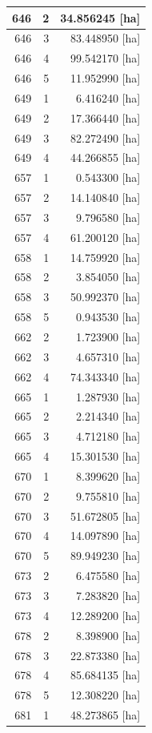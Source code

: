 \documentclass[11pt,]{book}
\begin{document}
\begin{table}
\begin{tabular}[t]{r|r|r}
\hline
646 & 2 & 34.856245 [ha]\\
\hline
646 & 3 & 83.448950 [ha]\\
\hline
646 & 4 & 99.542170 [ha]\\
\hline
646 & 5 & 11.952990 [ha]\\
\hline
649 & 1 & 6.416240 [ha]\\
\hline
649 & 2 & 17.366440 [ha]\\
\hline
649 & 3 & 82.272490 [ha]\\
\hline
649 & 4 & 44.266855 [ha]\\
\hline
657 & 1 & 0.543300 [ha]\\
\hline
657 & 2 & 14.140840 [ha]\\
\hline
657 & 3 & 9.796580 [ha]\\
\hline
657 & 4 & 61.200120 [ha]\\
\hline
658 & 1 & 14.759920 [ha]\\
\hline
658 & 2 & 3.854050 [ha]\\
\hline
658 & 3 & 50.992370 [ha]\\
\hline
658 & 5 & 0.943530 [ha]\\
\hline
662 & 2 & 1.723900 [ha]\\
\hline
662 & 3 & 4.657310 [ha]\\
\hline
662 & 4 & 74.343340 [ha]\\
\hline
665 & 1 & 1.287930 [ha]\\
\hline
665 & 2 & 2.214340 [ha]\\
\hline
665 & 3 & 4.712180 [ha]\\
\hline
665 & 4 & 15.301530 [ha]\\
\hline
670 & 1 & 8.399620 [ha]\\
\hline
670 & 2 & 9.755810 [ha]\\
\hline
670 & 3 & 51.672805 [ha]\\
\hline
670 & 4 & 14.097890 [ha]\\
\hline
670 & 5 & 89.949230 [ha]\\
\hline
673 & 2 & 6.475580 [ha]\\
\hline
673 & 3 & 7.283820 [ha]\\
\hline
673 & 4 & 12.289200 [ha]\\
\hline
678 & 2 & 8.398900 [ha]\\
\hline
678 & 3 & 22.873380 [ha]\\
\hline
678 & 4 & 85.684135 [ha]\\
\hline
678 & 5 & 12.308220 [ha]\\
\hline
681 & 1 & 48.273865 [ha]\\

\end{tabular}
\end{table}
\end{document}
